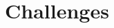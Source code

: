 \documentclass[]{report}
\begin{document}
\chapter{Challenges} \label{chap:Challenges}
\end{document}
